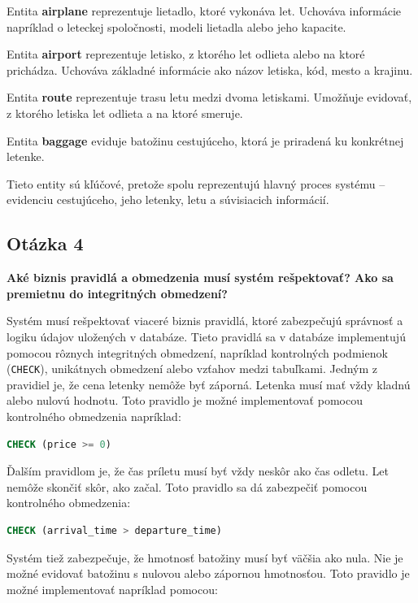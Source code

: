 \documentclass[11pt, a4paper]{article}
\begin{document}
Entita \textbf{airplane} reprezentuje lietadlo, ktoré vykonáva let. Uchováva
informácie napríklad o leteckej spoločnosti, modeli lietadla alebo jeho
kapacite.

Entita \textbf{airport} reprezentuje letisko, z ktorého let odlieta alebo na
ktoré prichádza. Uchováva základné informácie ako názov letiska, kód, mesto a
krajinu.

Entita \textbf{route} reprezentuje trasu letu medzi dvoma letiskami. Umožňuje
evidovať, z ktorého letiska let odlieta a na ktoré smeruje.

Entita \textbf{baggage} eviduje batožinu cestujúceho, ktorá je priradená ku
konkrétnej letenke.
\newline

Tieto entity sú kľúčové, pretože spolu reprezentujú hlavný proces systému --
evidenciu cestujúceho, jeho letenky, letu a súvisiacich informácií.

\subsection*{Otázka 4}
\textbf{Aké biznis pravidlá a obmedzenia musí systém rešpektovať? Ako sa premietnu do integritných obmedzení?}

Systém musí rešpektovať viaceré biznis pravidlá, ktoré zabezpečujú správnosť a
logiku údajov uložených v databáze. Tieto pravidlá sa v databáze implementujú
pomocou rôznych integritných obmedzení, napríklad kontrolných podmienok
(\texttt{CHECK}), unikátnych obmedzení alebo vzťahov medzi tabuľkami.
\newline
Jedným z pravidiel je, že cena letenky nemôže byť záporná. Letenka musí mať
vždy kladnú alebo nulovú hodnotu. Toto pravidlo je možné implementovať pomocou
kontrolného obmedzenia napríklad:

\begin{lstlisting}[language=SQL]
CHECK (price >= 0)
\end{lstlisting}

Ďalším pravidlom je, že čas príletu musí byť vždy neskôr ako čas odletu. Let
nemôže skončiť skôr, ako začal. Toto pravidlo sa dá zabezpečiť pomocou
kontrolného obmedzenia:

\begin{lstlisting}[language=SQL]
CHECK (arrival_time > departure_time)
\end{lstlisting}

Systém tiež zabezpečuje, že hmotnosť batožiny musí byť väčšia ako nula. Nie je
možné evidovať batožinu s nulovou alebo zápornou hmotnosťou. Toto pravidlo je
možné implementovať napríklad pomocou:
\end{document}
